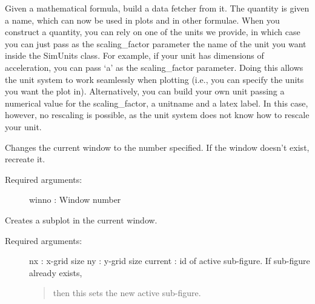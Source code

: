 \documentclass[letterpaper,10pt,english]{sphinxmanual}
\begin{document}

\begin{fulllineitems}
\label{index:facade.CreateUserQuantity}
Given a mathematical formula, build a data fetcher from it.
The quantity is given a name, which can now be used in plots and in other 
formulae.  When you construct a quantity, you can rely on one of the units we 
provide, in which case you can just pass as the scaling\_factor parameter the 
name of the unit you want inside the SimUnits class. For example, if your unit 
has dimensions of acceleration, you can pass `a' as the scaling\_factor 
parameter. Doing this allows the unit system to work seamlessly when plotting 
(i.e., you can specify the units you want the plot in).  Alternatively, you can 
build your own unit passing a numerical value for the scaling\_factor, 
a unitname and a latex label.  In this case, however, no rescaling is possible, 
as the unit system does not know how to rescale your unit.

\end{fulllineitems}


\begin{fulllineitems}
\label{index:facade.window}
Changes the current window to the number specified. If the window
doesn't exist, recreate it.
\begin{description}
\item[{Required arguments:}] \leavevmode
winno      : Window number

\end{description}

\end{fulllineitems}


\begin{fulllineitems}
\label{index:facade.subfigure}
Creates a subplot in the current window.
\begin{description}
\item[{Required arguments:}] \leavevmode
nx         : x-grid size
ny         : y-grid size
current    : id of active sub-figure.  If sub-figure already exists,
\begin{quote}

then this sets the new active sub-figure.
\end{quote}

\end{description}

\end{fulllineitems}
\end{document}
